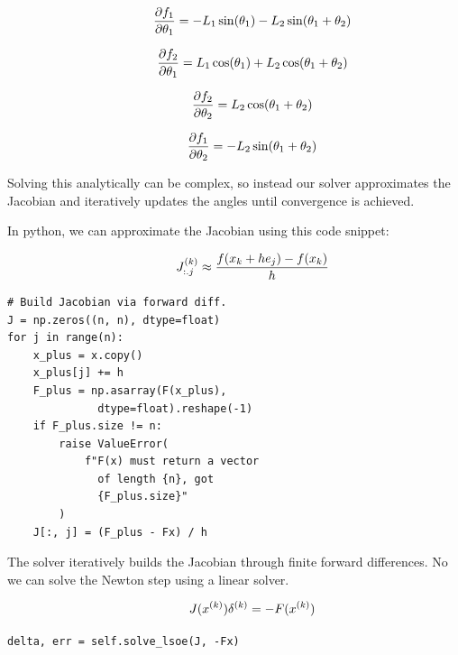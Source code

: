 \documentclass[letterpaper,twocolumn,fleqn]{article}
\begin{document}
\[\hspace{0.4in}
\frac{\partial f_1}{\partial \theta_1} = -L_1\sin(\theta_1) - L_2\sin(\theta_1 + \theta_2)
\]

\[\hspace{0.4in}
\frac{\partial f_2}{\partial \theta_1} = L_1\cos(\theta_1) + L_2\cos(\theta_1 + \theta_2)
\]

\[\hspace{0.4in}
\frac{\partial f_2}{\partial \theta_2} = L_2\cos(\theta_1 + \theta_2)
\]

\[\hspace{0.4in}
\frac{\partial f_1}{\partial \theta_2} = -L_2\sin(\theta_1 + \theta_2)
\]

\noindent Solving this analytically can be complex, so instead our solver approximates the Jacobian and iteratively updates the angles until convergence is achieved.
\vspace{0.1in}

\noindent In python, we can approximate the Jacobian using this code snippet:

\[\hspace{0.4in} J^{(k)}_{:.j} \approx \frac{f(x_k + h e_j) - f(x_k)}{h}\]

\begin{center}
\begin{minipage}{0.75\linewidth} %
\begin{verbatim}
# Build Jacobian via forward diff.
J = np.zeros((n, n), dtype=float)
for j in range(n):
    x_plus = x.copy()
    x_plus[j] += h
    F_plus = np.asarray(F(x_plus), 
              dtype=float).reshape(-1)
    if F_plus.size != n:
        raise ValueError(
            f"F(x) must return a vector 
              of length {n}, got 
              {F_plus.size}"
        )
    J[:, j] = (F_plus - Fx) / h
\end{verbatim}
\end{minipage}
\end{center}

\noindent The solver iteratively builds the Jacobian through finite forward differences. No we can solve the Newton step using a linear solver.

\[\hspace{0.4in}
J(x^{(k)}) \delta^{(k)} = -F(x^{(k)})
\]

\begin{center}
\begin{minipage}{0.75\linewidth} %
\begin{verbatim}
delta, err = self.solve_lsoe(J, -Fx)
\end{verbatim}
\end{minipage}
\end{center}
\end{document}
